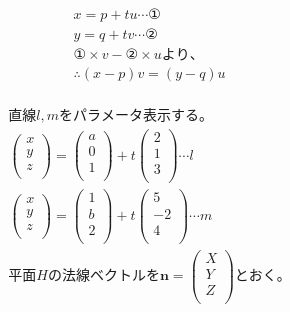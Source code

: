 \documentclass[dvipdfmx,uplatex]{jsarticle}
\begin{document}
  \begin{equation}
    \begin{aligned}
        & x=p+tu \cdots ① \nonumber\\
        & y=q+tv \cdots ② \nonumber\\
        &① \times v - ② \times uより、\nonumber\\
        &\therefore (x-p)v=(y-q)u \nonumber\\
    \end{aligned}
  \end{equation}

  \begin{equation}
    \begin{aligned}
        &直線l,mをパラメータ表示する。\nonumber\\
        &\begin{pmatrix} x\\ y\\ z\\ \end{pmatrix} = \begin{pmatrix} a\\ 0\\ 1\\ \end{pmatrix} + t\begin{pmatrix} 2\\ 1\\ 3\\ \end{pmatrix} \cdots l \nonumber\\
        &\begin{pmatrix} x\\ y\\ z\\ \end{pmatrix} = \begin{pmatrix} 1\\ b\\ 2\\ \end{pmatrix} + t\begin{pmatrix} 5\\ -2\\ 4\\ \end{pmatrix} \cdots m \nonumber\\
        &平面Hの法線ベクトルを\bm{n}=\begin{pmatrix} X\\ Y\\ Z\\ \end{pmatrix}とおく。

\end{aligned}
\end{equation}
\end{document}

